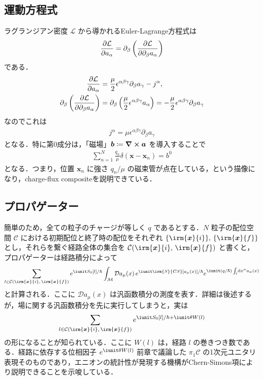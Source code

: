 \documentclass[TQFT_main]{subfiles}
\begin{document}
\subsection{運動方程式}

ラグランジアン密度 $\mathcal{L}$ から導かれるEuler-Lagrange方程式は
\begin{align}
    \pdv{\mathcal{L}}{a_\alpha} = \partial_\beta \left( \pdv{\mathcal{L}}{\partial_\beta a_\alpha} \right) 
\end{align}
である．
\begin{align}
    \pdv{\mathcal{L}}{a_\alpha} 
    &= \frac{\mu}{2} \epsilon^{\alpha \beta\gamma }\partial_\beta a_\gamma - j^\alpha, \\
    \partial_\beta \left( \pdv{\mathcal{L}}{\partial_\beta a_\alpha} \right) 
    &= \partial_\beta \left( \frac{\mu}{2} \epsilon^{\alpha \beta \gamma} a_\alpha \right) = -\frac{\mu}{2} \epsilon^{\alpha\beta\gamma} \partial_{\beta} a_\gamma
\end{align}
なのでこれは
\begin{align}
    j^\alpha = \mu \epsilon^{\alpha\beta\gamma} \partial_\beta a_\gamma
\end{align}
となる．特に第0成分は，「磁場」$\bm{b} \coloneqq \curl{\bm{a}}$ を導入することで
\begin{align}
    \sum_{n=1}^N \frac{q_n}{\mu} \delta (\bm{x} - \bm{x}_n) = b^0
\end{align}
となる．つまり，位置 $\bm{x}_n$ に強さ $q_n / \mu$ の磁束管が点在している，という描像になり，charge-flux compositeを説明できている．

\subsection{プロパゲーター}

簡単のため，全ての粒子のチャージが等しく $q$ であるとする．$N$ 粒子の配位空間 $\mathcal{C}$ における初期配位と終了時の配位をそれぞれ $\{\irm{\bm{x}}{i}\},\, \{\irm{\bm{x}}{f}\}$ とし，それらを繋ぐ経路全体の集合を $\mathcal{C}(\irm{\bm{x}}{i},\, \irm{\bm{x}}{f})$ と書くと，プロパゲーターは経路積分によって
\begin{align}
    \sum_{l \in \mathcal{C}(\irm{\bm{x}}{i},\, \irm{\bm{x}}{f})} e^{\iunit S_0[l]/\hbar } \int_{\mathcal{M}} \mathcal{D} a_\mu (x)\, e^{\iunit \irm{S}{CS}[a_\mu (x)]/\hbar} e^{\iunit (q/\hbar) \int_l \dd{x^\alpha} a_\alpha (x) }
\end{align}
と計算される．ここに $\mathcal{D} a_\mu (x)$ は汎函数積分の測度を表す．詳細は後述するが，場に関する汎函数積分を先に実行してしまうと，実は
\begin{align}
    \sum_{l \in \mathcal{C}(\irm{\bm{x}}{i},\, \irm{\bm{x}}{f})} e^{\iunit S_0 [l] /\hbar + \iunit \theta W(l)}
\end{align}
の形になることが知られている．ここに $W(l)$ は，経路 $l$ の巻きつき数である．経路に依存する位相因子 $e^{\iunit \theta W(l)}$ 前章で議論した $\pi_1 \mathcal{C}$ の1次元ユニタリ表現そのものであり，エニオンの統計性が発現する機構がChern-Simons項により説明できることを示唆している．
\end{document}
